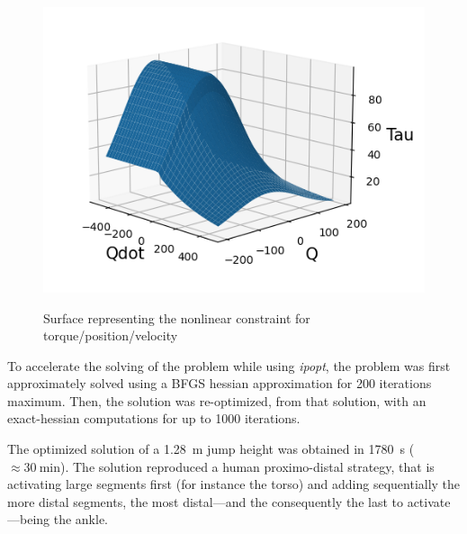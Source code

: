 \begin{figure}[h!]
\includegraphics[width=\columnwidth]{figures/graph_force_vitesse_longueur.png}\\
\caption{Surface representing the nonlinear constraint for torque/position/velocity }
\label{fig:graph_force_vitesse_longueur}
\end{figure}

To accelerate the solving of the problem while using \emph{ipopt}, the problem was first approximately solved using a BFGS hessian approximation for 200 iterations maximum.
Then, the solution was re-optimized, from that solution, with an exact-hessian computations for up to 1000 iterations.

The optimized solution of a \SI{1.28}{\meter} jump height was obtained in \SI{1780}{\second} ($\approx\SI{30}{\minute}$).
The solution reproduced a human proximo-distal strategy, that is activating large segments first (for instance the torso) and adding sequentially the more distal segments, the most distal---and the consequently the last to activate---being the ankle.
